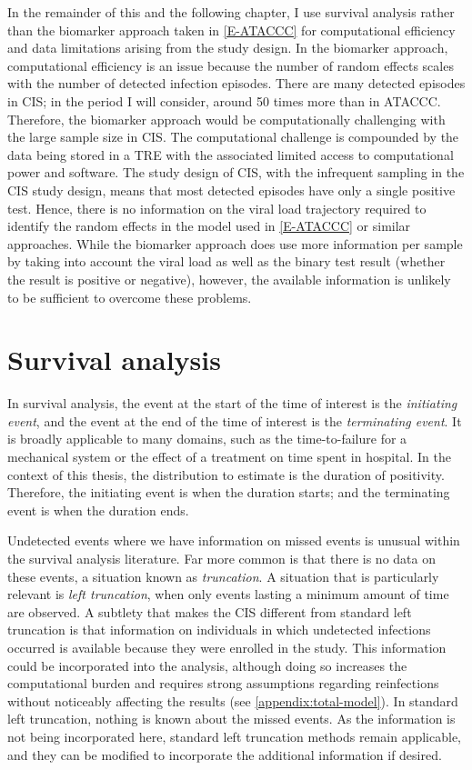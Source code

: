 \documentclass[thesis.tex]{subfiles}
\begin{document}
In the remainder of this and the following chapter, I use survival analysis rather than the biomarker approach taken in \cref{E-ATACCC} for computational efficiency and data limitations arising from the study design.
In the biomarker approach, computational efficiency is an issue because the number of random effects scales with the number of detected infection episodes.
There are many detected episodes in CIS; in the period I will consider, around 50 times more than in ATACCC.
Therefore, the biomarker approach would be computationally challenging with the large sample size in CIS.
The computational challenge is compounded by the data being stored in a TRE with the associated limited access to computational power and software.
The study design of CIS, with the infrequent sampling in the CIS study design, means that most detected episodes have only a single positive test.
Hence, there is no information on the viral load trajectory required to identify the random effects in the model used in \cref{E-ATACCC} or similar approaches.
While the biomarker approach does use more information per sample by taking into account the viral load as well as the binary test result (\ie whether the result is positive or negative), however, the available information is unlikely to be sufficient to overcome these problems.

\section{Survival analysis}

In survival analysis, the event at the start of the time of interest is the \emph{initiating event}, and the event at the end of the time of interest is the \emph{terminating event}.
It is broadly applicable to many domains, such as the time-to-failure for a mechanical system or the effect of a treatment on time spent in hospital.
In the context of this thesis, the distribution to estimate is the duration of positivity.
Therefore, the initiating event is when the duration starts; and the terminating event is when the duration ends.

Undetected events where we have information on missed events is unusual within the survival analysis literature.
Far more common is that there is no data on these events, a situation known as \emph{truncation}.
A situation that is particularly relevant is \emph{left truncation}, when only events lasting a minimum amount of time are observed.
A subtlety that makes the CIS different from standard left truncation is that information on individuals in which undetected infections occurred is available because they were enrolled in the study.
This information could be incorporated into the analysis, although doing so increases the computational burden and requires strong assumptions regarding reinfections without noticeably affecting the results (see \cref{appendix:total-model}).
In standard left truncation, nothing is known about the missed events.
As the information is not being incorporated here, standard left truncation methods remain applicable, and they can be modified to incorporate the additional information if desired.
\end{document}
